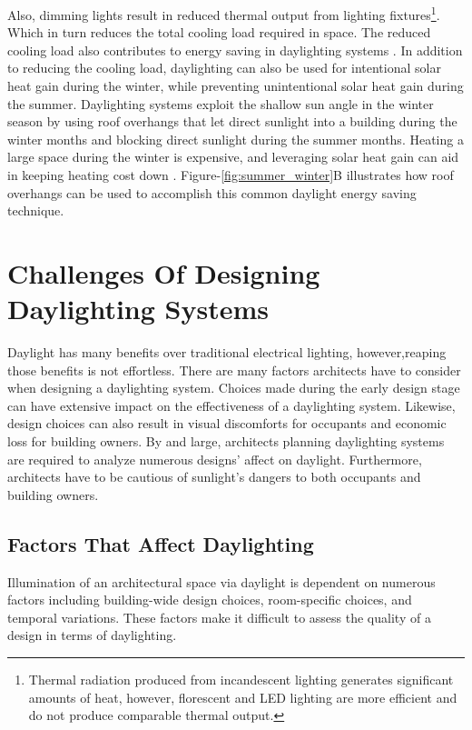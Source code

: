 Also, dimming lights result in reduced thermal output from lighting fixtures\footnote{Thermal radiation produced from incandescent lighting generates significant amounts of heat, however, florescent and LED lighting are more efficient and do not produce comparable thermal output.}.  Which in turn reduces the total cooling load required in space. The reduced cooling load also contributes to energy saving in daylighting systems \cite{Leslie}.  In addition to reducing the cooling load, daylighting can also be used for intentional solar heat gain during the winter, while preventing unintentional solar heat gain during the summer.  Daylighting systems exploit the shallow sun angle in the winter season by using roof overhangs that let direct sunlight into a building during the winter months and blocking direct sunlight during the summer months. Heating a large space during the winter is expensive, and leveraging solar heat gain can aid in keeping heating cost down \cite{Bodart}.  Figure-\ref{fig:summer_winter}B illustrates how roof overhangs can be used to accomplish this common daylight energy saving technique.  \\

\section{Challenges Of Designing Daylighting Systems}
  
Daylight has many benefits over traditional electrical lighting, however,reaping those benefits is not effortless. There are many factors architects have to consider when designing a daylighting system. Choices made during the early design stage can have extensive impact on the effectiveness of a daylighting system. Likewise, design choices can also result in visual discomforts for occupants and economic loss for building owners. By and large, architects planning daylighting systems are required to analyze numerous designs' affect on daylight. Furthermore, architects have to be cautious of sunlight's dangers to both occupants and building owners. \\

\subsection{Factors That Affect Daylighting}

Illumination of an architectural space via daylight is dependent on numerous factors including building-wide design choices, room-specific choices, and temporal variations. These factors make it difficult to assess the quality of a design in terms of daylighting.\\

